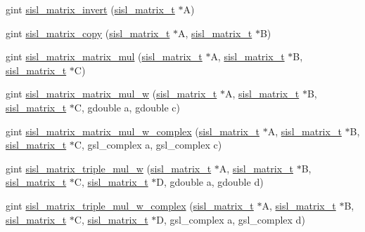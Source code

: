 \begin{DoxyCompactItemize}
\item 
gint \hyperlink{group__matrix_ga9ebe378f73157b236e04d65d0d982864}{sisl\+\_\+matrix\+\_\+invert} (\hyperlink{group__matrix_gad147923587b355644defb9bfbf981740}{sisl\+\_\+matrix\+\_\+t} $\ast$A)
\item 
gint \hyperlink{group__matrix_ga76214ff23ddf1c1175d918868ba29b97}{sisl\+\_\+matrix\+\_\+copy} (\hyperlink{group__matrix_gad147923587b355644defb9bfbf981740}{sisl\+\_\+matrix\+\_\+t} $\ast$A, \hyperlink{group__matrix_gad147923587b355644defb9bfbf981740}{sisl\+\_\+matrix\+\_\+t} $\ast$B)
\item 
gint \hyperlink{group__matrix_ga4eba2be7655e4f1b1845709f27994445}{sisl\+\_\+matrix\+\_\+matrix\+\_\+mul} (\hyperlink{group__matrix_gad147923587b355644defb9bfbf981740}{sisl\+\_\+matrix\+\_\+t} $\ast$A, \hyperlink{group__matrix_gad147923587b355644defb9bfbf981740}{sisl\+\_\+matrix\+\_\+t} $\ast$B, \hyperlink{group__matrix_gad147923587b355644defb9bfbf981740}{sisl\+\_\+matrix\+\_\+t} $\ast$C)
\item 
gint \hyperlink{group__matrix_ga1b38f4144079da23373564e920652425}{sisl\+\_\+matrix\+\_\+matrix\+\_\+mul\+\_\+w} (\hyperlink{group__matrix_gad147923587b355644defb9bfbf981740}{sisl\+\_\+matrix\+\_\+t} $\ast$A, \hyperlink{group__matrix_gad147923587b355644defb9bfbf981740}{sisl\+\_\+matrix\+\_\+t} $\ast$B, \hyperlink{group__matrix_gad147923587b355644defb9bfbf981740}{sisl\+\_\+matrix\+\_\+t} $\ast$C, gdouble a, gdouble c)
\item 
gint \hyperlink{group__matrix_ga2a471c9616271db2f9ee139c9fe81969}{sisl\+\_\+matrix\+\_\+matrix\+\_\+mul\+\_\+w\+\_\+complex} (\hyperlink{group__matrix_gad147923587b355644defb9bfbf981740}{sisl\+\_\+matrix\+\_\+t} $\ast$A, \hyperlink{group__matrix_gad147923587b355644defb9bfbf981740}{sisl\+\_\+matrix\+\_\+t} $\ast$B, \hyperlink{group__matrix_gad147923587b355644defb9bfbf981740}{sisl\+\_\+matrix\+\_\+t} $\ast$C, gsl\+\_\+complex a, gsl\+\_\+complex c)
\item 
gint \hyperlink{group__matrix_gaf23a4fdd6ccbcc355f2e48ccf12deed4}{sisl\+\_\+matrix\+\_\+triple\+\_\+mul\+\_\+w} (\hyperlink{group__matrix_gad147923587b355644defb9bfbf981740}{sisl\+\_\+matrix\+\_\+t} $\ast$A, \hyperlink{group__matrix_gad147923587b355644defb9bfbf981740}{sisl\+\_\+matrix\+\_\+t} $\ast$B, \hyperlink{group__matrix_gad147923587b355644defb9bfbf981740}{sisl\+\_\+matrix\+\_\+t} $\ast$C, \hyperlink{group__matrix_gad147923587b355644defb9bfbf981740}{sisl\+\_\+matrix\+\_\+t} $\ast$D, gdouble a, gdouble d)
\item 
gint \hyperlink{group__matrix_gad8bb04946d2a31519333b75882bd1c53}{sisl\+\_\+matrix\+\_\+triple\+\_\+mul\+\_\+w\+\_\+complex} (\hyperlink{group__matrix_gad147923587b355644defb9bfbf981740}{sisl\+\_\+matrix\+\_\+t} $\ast$A, \hyperlink{group__matrix_gad147923587b355644defb9bfbf981740}{sisl\+\_\+matrix\+\_\+t} $\ast$B, \hyperlink{group__matrix_gad147923587b355644defb9bfbf981740}{sisl\+\_\+matrix\+\_\+t} $\ast$C, \hyperlink{group__matrix_gad147923587b355644defb9bfbf981740}{sisl\+\_\+matrix\+\_\+t} $\ast$D, gsl\+\_\+complex a, gsl\+\_\+complex d)

\end{DoxyCompactItemize}
